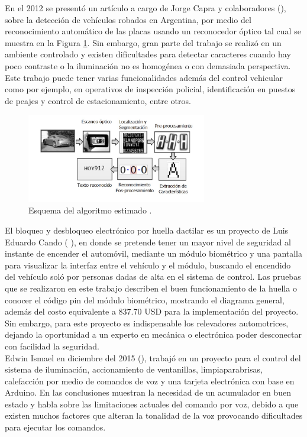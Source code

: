 En el 2012 se presentó un artículo a cargo de Jorge Capra y colaboradores (\cite{UPS-13}), sobre la detección de vehículos robados en Argentina, por medio del reconocimiento automático de las placas usando un reconocedor óptico tal cual se muestra en la Figura \ref{Fseis}. Sin embargo, gran parte del trabajo se realizó en un ambiente controlado y existen dificultades para detectar caracteres cuando hay poco contraste o la iluminación no es homogénea o con demasiada perspectiva. Este trabajo puede tener varias funcionalidades además del control vehicular como por ejemplo, en operativos de inspección policial, identificación en puestos de peajes y control de estacionamiento, entre otros.\\

%
\begin{figure}[H]
\centering
\includegraphics[width=0.7\textwidth]{introduccion/fig9.jpg}
\caption{Esquema del algoritmo estimado \cite{UPS-13}. }
\label{Fseis}
\end{figure}
%

El bloqueo y desbloqueo electrónico por huella dactilar es un proyecto de Luis Eduardo Cando (\cite{UPS-09} ), en donde se pretende tener un mayor nivel de seguridad al instante de encender el automóvil, mediante un módulo biométrico y una pantalla para visualizar la interfaz entre el vehículo y el módulo, buscando el encendido del vehículo soló por personas dadas de alta en el sistema de control. Las pruebas que se realizaron en este trabajo describen el buen funcionamiento de la huella o conocer el código pin del módulo biométrico, mostrando el diagrama general, además del costo equivalente a  837.70 USD para la implementación del proyecto. Sin embargo, para este proyecto es indispensable los relevadores automotrices, dejando la oportunidad a un experto en mecánica o electrónica poder desconectar con facilidad la seguridad.\\


Edwin Ismael en diciembre del 2015 (\cite{UPS-11}), trabajó en un proyecto para el control del sistema de iluminación, accionamiento de ventanillas, limpiaparabrisas, calefacción por medio de comandos de voz y una tarjeta electrónica con base en Arduino. En las conclusiones muestran la necesidad de un acumulador en buen estado y habla sobre las limitaciones actuales del comando por voz, debido a que existen muchos factores que alteran la tonalidad de la voz provocando dificultades para ejecutar los comandos. \\


